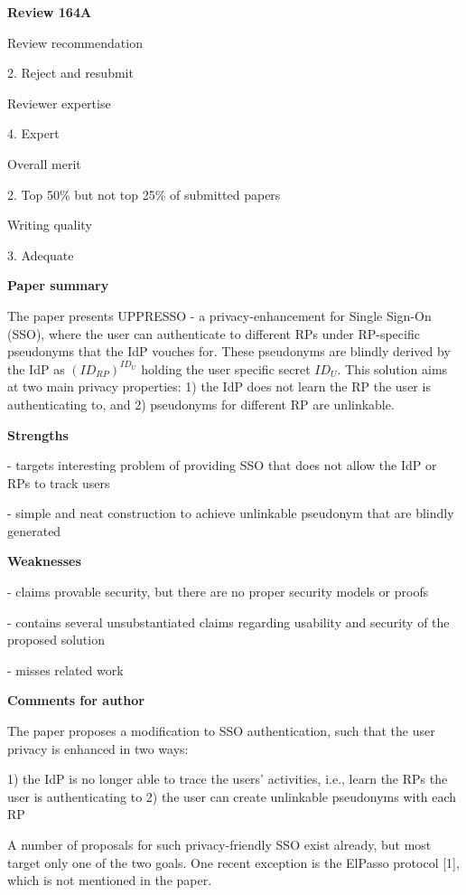 \documentclass[letterpaper,onecolumn,10pt]{article}
\begin{document}
\vspace{1mm}\noindent\textbf{Review 164A}


Review recommendation


2. Reject and resubmit

Reviewer expertise


4. Expert

Overall merit


2. Top 50\% but not top 25\% of submitted papers

Writing quality


3. Adequate

\vspace{1mm}\noindent\textbf{Paper summary}


The paper presents UPPRESSO - a privacy-enhancement for Single Sign-On (SSO), where the user can authenticate to different RPs under RP-specific pseudonyms that the IdP vouches for. These pseudonyms are blindly derived by the IdP as $(ID_{RP})^{ID_U}$ holding the user specific secret $ID_U$. This solution aims at two main privacy properties: 1) the IdP does not learn the RP the user is authenticating to, and 2) pseudonyms for different RP are unlinkable.

\vspace{1mm}\noindent\textbf{Strengths}


- targets interesting problem of providing SSO that does not allow the IdP or RPs to track users

- simple and neat construction to achieve unlinkable pseudonym that are blindly generated

\vspace{1mm}\noindent\textbf{Weaknesses}


- claims provable security, but there are no proper security models or proofs

- contains several unsubstantiated claims regarding usability and security of the proposed solution

- misses related work

\vspace{1mm}\noindent\textbf{Comments for author}

The paper proposes a modification to SSO authentication, such that the user privacy is enhanced in two ways:

1) the IdP is no longer able to trace the users' activities, i.e., learn the RPs the user is authenticating to
2) the user can create unlinkable pseudonyms with each RP

A number of proposals for such privacy-friendly SSO exist already, but most target only one of the two goals. One recent exception is the ElPasso protocol [1], which is not mentioned in the paper. 
\end{document}
